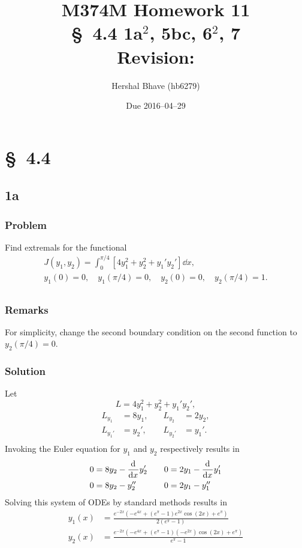 \documentclass[12pt,twoside]{article}
\title{M374M Homework 11 \\
  \normalsize{\S~4.4 1a$^2$, 5bc, 6$^2$, 7} \\
  Revision: }
\author{Hershal Bhave (hb6279)}
\date{Due 2016--04--29}
\begin{document}
\maketitle

\section{\S~4.4}
\subsection{1a}
\subsubsection*{Problem}
Find extremals for the functional
\begin{equation}
  \label{eq:1a-problem}
  \begin{aligned}
    J(y_1, y_2)=\int_0^{\pi/4}[4y_1^2+y_2^2+y_1'y_2']\dd{x}, \\
    y_1(0)=0, \quad y_1(\pi/4)=0,\quad y_2(0)=0,\quad y_2(\pi/4)=1. \\
  \end{aligned}
\end{equation}

\subsubsection*{Remarks}
For simplicity, change the second boundary condition on the second function to
$y_2(\pi/4)=0$.

\subsubsection*{Solution}
Let
$$L = 4y_1^2 + y_2^2 + y_1'y_2',$$
\begin{align*}
  L_{y_1} &= 8 y_1, &\quad L_{y_2} &= 2 y_2, \\
  L_{y_1'} &= y_2', &\quad L_{y_2'} &= y_1'. \\
\end{align*}
Invoking the Euler equation for $y_1$ and $y_2$ respectively results in
\begin{align*}
  0 &= 8 y_2 - \frac{\mathrm{d}^{} {}}{\mathrm{d}{x}^{}} y_2' &\quad 0 &= 2y_1 - \frac{\mathrm{d}^{} {}}{\mathrm{d}{x}^{}} y_1' \\
  0 &= 8 y_2 - y_2'' &\quad 0 &= 2y_1 - y_1'' \\
\end{align*}
Solving this system of ODEs by standard methods results in
\begin{equation*}
  \boxed{
    \begin{aligned}
      y_1(x) &= \frac{e^{-2 x} \left(-e^{4 x}+\left(e^{\pi }-1\right) e^{2 x} \cos (2 x)+e^{\pi }\right)}{2 \left(e^{\pi }-1\right)} \\
      y_2(x) &= \frac{e^{-2 x} \left(-e^{4 x}+\left(e^{\pi }-1\right) \left(-e^{2
              x}\right) \cos (2 x)+e^{\pi }\right)}{e^{\pi }-1}
    \end{aligned}
  }
\end{equation*}
\end{document}
